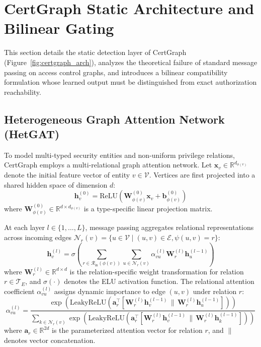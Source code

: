 \section{CertGraph Static Architecture and Bilinear Gating}
\label{sec:certgraph_arch}

This section details the static detection layer of CertGraph (Figure~\ref{fig:certgraph_arch}), analyzes the theoretical failure of standard message passing on access control graphs, and introduces a bilinear compatibility formulation whose learned output must be distinguished from exact authorization reachability.

\subsection{Heterogeneous Graph Attention Network (HetGAT)}
To model multi-typed security entities and non-uniform privilege relations, CertGraph employs a multi-relational graph attention network. Let $\mathbf{x}_v \in \mathbb{R}^{d_{\phi(v)}}$ denote the initial feature vector of entity $v \in \mathcal{V}$. Vertices are first projected into a shared hidden space of dimension $d$:
\begin{equation}
\mathbf{h}_v^{(0)} = \text{ReLU} \left( \mathbf{W}_{\phi(v)}^{(0)} \mathbf{x}_v + \mathbf{b}_{\phi(v)}^{(0)} \right)
\end{equation}
where $\mathbf{W}_{\phi(v)}^{(0)} \in \mathbb{R}^{d \times d_{\phi(v)}}$ is a type-specific linear projection matrix.

At each layer $l \in \{1, \dots, L\}$, message passing aggregates relational representations across incoming edges $\mathcal{N}_r(v) = \{u \in \mathcal{V} \mid (u, v) \in \mathcal{E}, \psi(u, v) = r\}$:
\begin{equation}
\mathbf{h}_v^{(l)} = \sigma \left( \sum_{r \in \mathcal{R}_{\text{in}}(\phi(v))} \sum_{u \in \mathcal{N}_r(v)} \alpha_{vu}^{(l)} \mathbf{W}_r^{(l)} \mathbf{h}_u^{(l-1)} \right)
\end{equation}
where $\mathbf{W}_r^{(l)} \in \mathbb{R}^{d \times d}$ is the relation-specific weight transformation for relation $r \in \mathcal{T}_E$, and $\sigma(\cdot)$ denotes the ELU activation function. The relational attention coefficient $\alpha_{vu}^{(l)}$ assigns dynamic importance to edge $(u, v)$ under relation $r$:
\begin{equation}
\alpha_{vu}^{(l)} = \frac{\exp \left( \text{LeakyReLU} \left( \mathbf{a}_r^{\top} [\mathbf{W}_r^{(l)} \mathbf{h}_v^{(l-1)} \,\|\, \mathbf{W}_r^{(l)} \mathbf{h}_u^{(l-1)}] \right) \right)}{\sum_{k \in \mathcal{N}_r(v)} \exp \left( \text{LeakyReLU} \left( \mathbf{a}_r^{\top} [\mathbf{W}_r^{(l)} \mathbf{h}_v^{(l-1)} \,\|\, \mathbf{W}_r^{(l)} \mathbf{h}_k^{(l-1)}] \right) \right)}
\end{equation}
where $\mathbf{a}_r \in \mathbb{R}^{2d}$ is the parameterized attention vector for relation $r$, and $\|$ denotes vector concatenation.

